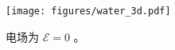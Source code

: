 \documentclass{article}
\begin{document}
  

   \begin{figure}
    \centering
    \texttt{[image: figures/water\_3d.pdf]}
    \caption{电场为    $\mathcal{E}=0$    。  }
    \label{fig:water_3d}
\end{figure}     


  
\end{document}
